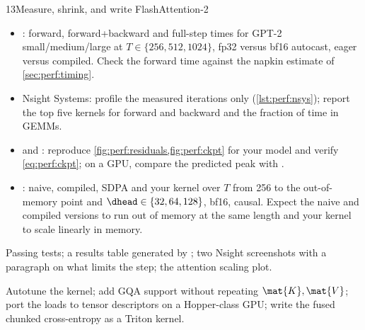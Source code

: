 \begin{labbox}{13}{Measure, shrink, and write FlashAttention-2}
\begin{itemize}
\item {}: forward, forward+backward and full-step times for GPT-2 small/medium/large at
  $T\in\{256,512,1024\}$, fp32 versus bf16 autocast, eager versus compiled. Check the forward time
  against the napkin estimate of \cref{sec:perf:timing}.
\item Nsight Systems: profile the measured iterations only (\cref{lst:perf:nsys}); report the top five
  kernels for forward and backward and the fraction of time in GEMMs.
\item {} and : reproduce \cref{fig:perf:residuals,fig:perf:ckpt} for
  your model and verify \cref{eq:perf:ckpt}; on a GPU, compare the predicted peak with
  .
\item {}: naive, compiled, SDPA and your kernel over $T$ from 256 to the
  out-of-memory point and $\dhead\in\{32,64,128\}$, bf16, causal. Expect the naive and compiled
  versions to run out of memory at the same length and your kernel to scale linearly in memory.
\end{itemize}

Passing tests; a results table generated by ; two Nsight screenshots
with a paragraph on what limits the step; the attention scaling plot.

Autotune the kernel; add GQA support without repeating $\mat{K},\mat{V}$; port the loads to tensor
descriptors on a Hopper-class GPU; write the fused chunked cross-entropy as a Triton kernel.
\end{labbox}
